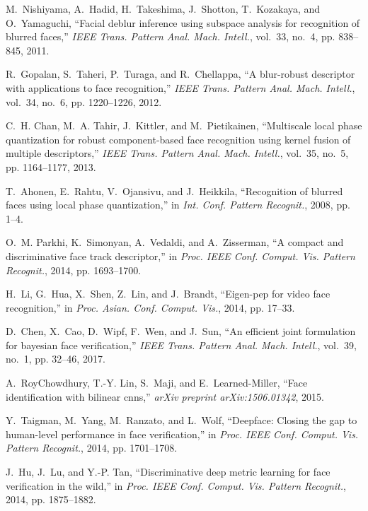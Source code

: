 \documentclass[10pt,journal,cspaper,compsoc]{IEEEtran}
\begin{document}
\begin{thebibliography}{10}
M.~Nishiyama, A.~Hadid, H.~Takeshima, J.~Shotton, T.~Kozakaya, and
  O.~Yamaguchi, ``Facial deblur inference using subspace analysis for
  recognition of blurred faces,'' \emph{IEEE Trans. Pattern Anal. Mach.
  Intell.}, vol.~33, no.~4, pp. 838--845, 2011.

R.~Gopalan, S.~Taheri, P.~Turaga, and R.~Chellappa, ``A blur-robust descriptor
  with applications to face recognition,'' \emph{IEEE Trans. Pattern Anal.
  Mach. Intell.}, vol.~34, no.~6, pp. 1220--1226, 2012.

C.~H. Chan, M.~A. Tahir, J.~Kittler, and M.~Pietikainen, ``Multiscale local
  phase quantization for robust component-based face recognition using kernel
  fusion of multiple descriptors,'' \emph{IEEE Trans. Pattern Anal. Mach.
  Intell.}, vol.~35, no.~5, pp. 1164--1177, 2013.

T.~Ahonen, E.~Rahtu, V.~Ojansivu, and J.~Heikkila, ``Recognition of blurred
  faces using local phase quantization,'' in \emph{Int. Conf. Pattern
  Recognit.}, 2008, pp. 1--4.

O.~M. Parkhi, K.~Simonyan, A.~Vedaldi, and A.~Zisserman, ``A compact and
  discriminative face track descriptor,'' in \emph{Proc. IEEE Conf. Comput.
  Vis. Pattern Recognit.}, 2014, pp. 1693--1700.

H.~Li, G.~Hua, X.~Shen, Z.~Lin, and J.~Brandt, ``Eigen-pep for video face
  recognition,'' in \emph{Proc. Asian. Conf. Comput. Vis.}, 2014, pp. 17--33.

D.~Chen, X.~Cao, D.~Wipf, F.~Wen, and J.~Sun, ``An efficient joint formulation
  for bayesian face verification,'' \emph{IEEE Trans. Pattern Anal. Mach.
  Intell.}, vol.~39, no.~1, pp. 32--46, 2017.

A.~RoyChowdhury, T.-Y. Lin, S.~Maji, and E.~Learned-Miller, ``Face
  identification with bilinear cnns,'' \emph{arXiv preprint arXiv:1506.01342},
  2015.

Y.~Taigman, M.~Yang, M.~Ranzato, and L.~Wolf, ``Deepface: Closing the gap to
  human-level performance in face verification,'' in \emph{Proc. IEEE Conf.
  Comput. Vis. Pattern Recognit.}, 2014, pp. 1701--1708.

J.~Hu, J.~Lu, and Y.-P. Tan, ``Discriminative deep metric learning for face
  verification in the wild,'' in \emph{Proc. IEEE Conf. Comput. Vis. Pattern
  Recognit.}, 2014, pp. 1875--1882.


\end{thebibliography}
\end{document}
